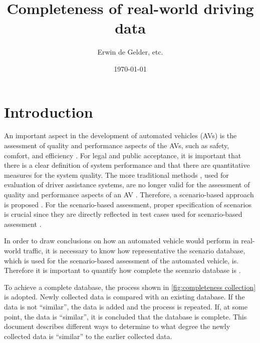 \documentclass[10pt,final,a4paper,oneside,onecolumn]{article}
\def\reptitle{Completeness of real-world driving data}
\def\repauthor{Erwin de Gelder, etc.}
\theoremstyle{plain}\newtheorem{definition}{Definition}[section]    %
\theoremstyle{definition}\newtheorem{example}{Example}[section]     %
\theoremstyle{remark}\newtheorem{remarkenv}{Remark}[section]        %
\begin{document}

\title{\textbf{\reptitle}}
\author{\repauthor}
\date{\today}
\maketitle

\tableofcontents

\newpage

\section{Introduction}
\label{sec:introduction}

An important aspect in the development of automated vehicles (AVs) is the assessment of quality and performance aspects of the AVs, such as safety, comfort, and efficiency \cite{bengler2014threedecades, stellet2015taxonomy, wachenfeld2016release, putz2017pegasus, roesener2016scenariobased, kompass2015sicherheitsveranderung}. 
For legal and public acceptance, it is important that there is a clear definition of system performance and that there are quantitative measures for the system quality. 
The more traditional methods \cite{response2006code, ISO26262}, used for evaluation of driver assistance systems, are no longer valid for the assessment of quality and performance aspects of an AV \cite{wachenfeld2016release}. 
Therefore, a scenario-based approach is proposed \cite{roesener2016scenariobased, putz2017pegasus, kompass2015sicherheitsveranderung}. 
For the scenario-based assessment, proper specification of scenarios is crucial since they are directly reflected in test cases used for scenario-based assessment \cite{stellet2015taxonomy}.

In order to draw conclusions on how an automated vehicle would perform in real-world traffic, it is necessary to know how representative the scenario database, which is used for the scenario-based assessment of the automated vehicle, is. Therefore it is important to quantify how complete the scenario database is \cite{geyer2014, alvarez2017prospective, stellet2015taxonomy}.

To achieve a complete database, the process shown in \cref{fig:completeness collection} is adopted. Newly collected data is compared with an existing database. If the data is not ``similar'', the data is added and the process is repeated. If, at some point, the data is ``similar'', it is concluded that the database is complete. This document describes different ways to determine to what degree the newly collected data is ``similar'' to the earlier collected data.
\end{document}
